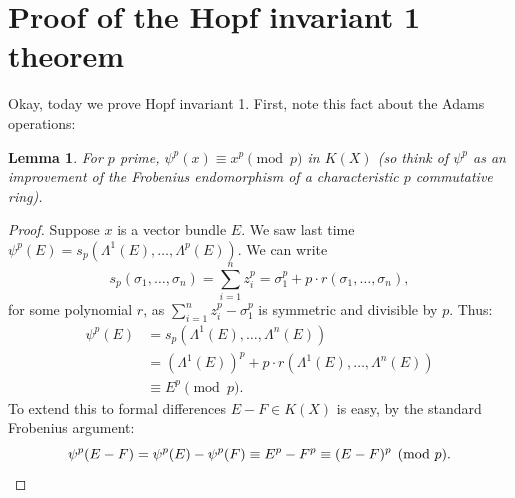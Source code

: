 \documentclass{article}
\providecommand{\OutputProofOfHopfInvariantOne}{13}
\newtheorem{lem}[thm]{Lemma}
\theoremstyle{definition}
\begin{document}
\section{Proof of the Hopf invariant 1 theorem} %
\label{ProofOfHopfInvariantOne}
\ifx\OutputProofOfHopfInvariantOne\undefined\else
Okay, today we prove Hopf invariant 1.  First, note this fact about the Adams operations:
\begin{lem}\label{frobeniuslemma}
For $p$ prime, $\psi^p(x) \equiv x^p \pmod{p}$ in $K(X)$ (so think of $\psi^p$ as an improvement of the Frobenius endomorphism of a characteristic $p$ commutative ring).
\end{lem}
\begin{proof}
Suppose $x$ is a vector bundle $E$.  We saw last time $\psi^p(E) = s_p(\Lambda^1 (E), \ldots, \Lambda^p (E))$. We can write 
\[s_p(\sigma_1, \ldots, \sigma_n) = \sum_{i=1}^n z_i^p = \sigma_1^p + p \cdot r(\sigma_1, \ldots, \sigma_n),\]
for some polynomial $r$, as $\sum_{i=1}^n z_i^p - \sigma_1^p$ is symmetric and divisible by $p$.  Thus:
\begin{align*}
\psi^p(E) & = s_p(\Lambda^1 (E), \ldots, \Lambda^n (E)) \\
& = (\Lambda^1 (E))^p + p \cdot r(\Lambda^1 (E), \ldots, \Lambda^n (E)) \\
& \equiv E^p \pmod p.
\end{align*}
To extend this to formal differences $E-F\in K(X)$ is easy, by the standard Frobenius argument:
\[\psi^p(E - F)  = \psi^p(E) - \psi^p(F)
\equiv E^p-F^p\equiv(E-F)^p \pmod{p}.\qedhere\]
\end{proof}
\end{document}
